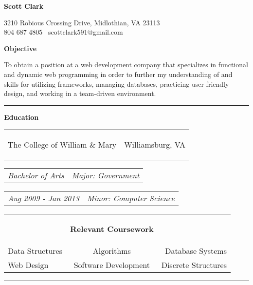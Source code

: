 \documentclass[11pt]{article}
\makeatletter
\newcommand{\headerrow}[2]
{\begin{tabular*}{\linewidth}{l@{\extracolsep{\fill}}r}
	#1 &
	#2 \\
\end{tabular*}}
\makeatother
\begin{document}
\begin{center}
	\begin{huge}
		\bf Scott Clark
	\end{huge}
	
	\large 3210 Robious Crossing Drive, Midlothian, VA 23113 \\
	\large 804 687 4805 \textbullet\ scottclark591@gmail.com
\end{center}

\begin{LARGE}
	\bf Objective
\end{LARGE}
\vspace{-0.5em}
\begin{center}
To obtain a position at a web development company that specializes in functional and dynamic web programming in order to further my understanding of and skills for utilizing frameworks, managing databases, practicing user-friendly design, and working in a team-driven environment. 
\end{center}

\hrule
\vspace{0.5em}

\begin{LARGE}
	\bf Education
\end{LARGE}

\vspace{0.5em}

\headerrow
	{\begin{Large}The College of William \& Mary\end{Large}}
	{Williamsburg, VA}
\headerrow
	{\textit{Bachelor of Arts}}
	{\textit{Major: Government}}
\headerrow
	{\textit{Aug 2009 - Jan 2013}}
	{\textit{Minor: Computer Science}}

\vspace{-1.0em}
	
\begin{center}
	\begin{tabular}{lcr}
		& \begin{Large} \bf Relevant Coursework \end{Large} & \\
		Data Structures & Algorithms & Database Systems \\
		Web Design & Software Development & Discrete Structures \\
	\end{tabular}
\end{center}

\vspace{-0.8em}
\hrule
\vspace{0.5em}
\end{document}
